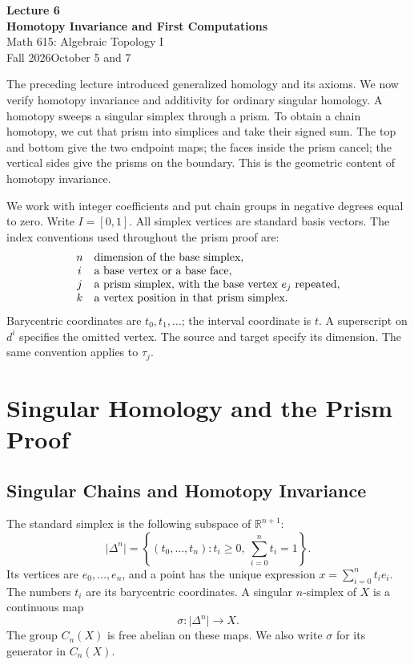 \documentclass[11pt]{article}
\newcommand{\coursetitle}[3]{\begin{center}{\large\bfseries\color{teal}#1}\\[4pt]{\LARGE\bfseries\color{teal}#2}\\[6pt]Math 615: Algebraic Topology I\\Fall 2026\quad\textbar\quad #3\end{center}}
\newcommand{\coursecontents}{{\small\setlength{\parskip}{0pt}\tableofcontents}}
\begin{document}
\coursetitle{Lecture 6}{Homotopy Invariance and First Computations}{October 5 and 7}
The preceding lecture introduced generalized homology and its axioms. We now verify homotopy invariance and additivity for ordinary singular homology. A homotopy sweeps a singular simplex through a prism. To obtain a chain homotopy, we cut that prism into simplices and take their signed sum. The top and bottom give the two endpoint maps; the faces inside the prism cancel; the vertical sides give the prisms on the boundary. This is the geometric content of homotopy invariance.

We work with integer coefficients and put chain groups in negative degrees equal to zero. Write $I=[0,1]$. All simplex vertices are standard basis vectors. The index conventions used throughout the prism proof are:
\[
\begin{array}{c l}
 n&\text{dimension of the base simplex},\\
 i&\text{a base vertex or a base face},\\
 j&\text{a prism simplex, with the base vertex }e_j\text{ repeated},\\
 k&\text{a vertex position in that prism simplex}.
\end{array}
\]
Barycentric coordinates are $t_0,t_1,\ldots$; the interval coordinate is $t$. A superscript on $d^i$ specifies the omitted vertex. The source and target specify its dimension. The same convention applies to $\tau_j$.
\coursecontents

\section{Singular Homology and the Prism Proof}\label{sec:singular-homology}
\subsection{Singular Chains and Homotopy Invariance}
The standard simplex is the following subspace of $\mathbb R^{n+1}$:
\[
\lvert\Delta^n\rvert=\left\{(t_0,\ldots,t_n):t_i\ge0,\ \sum_{i=0}^nt_i=1\right\}.
\]
Its vertices are $e_0,\ldots,e_n$, and a point has the unique expression $x=\sum_{i=0}^nt_ie_i$. The numbers $t_i$ are its barycentric coordinates. A singular $n$-simplex of $X$ is a continuous map
\[
\sigma:\lvert\Delta^n\rvert\longrightarrow X.
\]
The group $C_n(X)$ is free abelian on these maps. We also write $\sigma$ for its generator in $C_n(X)$.
\end{document}
